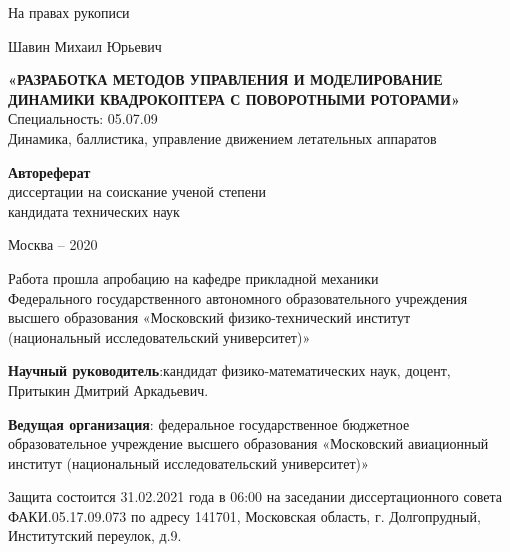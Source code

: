 \thispagestyle{empty}

{
	\vskip 5mm
}

\begin{flushright}
	На правах рукописи
\end{flushright}


{
	\vskip 45mm
}

\begin{center}
	Шавин Михаил Юрьевич
\end{center}
\begin{center} 
	\textbf{«РАЗРАБОТКА МЕТОДОВ УПРАВЛЕНИЯ И МОДЕЛИРОВАНИЕ ДИНАМИКИ КВАДРОКОПТЕРА С ПОВОРОТНЫМИ РОТОРАМИ»} \\
	Специальность: 05.07.09 \\
	Динамика, баллистика, управление движением летательных аппаратов
\end{center}

{
	\vskip 20mm
}

\begin{center} 
	\textbf{Автореферат} \\
	диссертации на соискание ученой степени \\
	кандидата технических наук
\end{center}


{
	\vskip 55mm
}

\begin{center} 
	Москва -- 2020
\end{center}

\newpage %

\begin{center} 
	Работа прошла апробацию на кафедре прикладной механики \\
	Федерального государственного автономного образовательного учреждения \\
	высшего образования «Московский физико-технический институт \\
	(национальный исследовательский университет)»

\end{center}

\textbf{Научный руководитель}:кандидат физико-математических наук, доцент, Притыкин Дмитрий Аркадьевич.

\textbf{Ведущая организация}:
федеральное государственное бюджетное образовательное учреждение высшего образования «Московский авиационный институт (национальный исследовательский университет)»

Защита состоится 31.02.2021 года в 06:00 на заседании диссертационного совета ФАКИ.05.17.09.073 по адресу 141701, Московская область, г. Долгопрудный, Институтский переулок, д.9.

